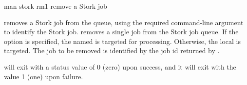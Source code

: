 \begin{ManPage}{}{man-stork-rm}{1}
{remove a Stork job}

\Synopsis {}
\ToolArgsBase

\Storkname
{}


\Description 

 removes a Stork job from the queue,
using the required command-line argument to identify the Stork job.
 removes a single job from the Stork job queue.  
If the  option is specified, the named  is targeted
for processing.  Otherwise, the local  is targeted.
The job to be removed is identified by the job id returned by  .

\begin{Options}
	\ToolArgsBaseDesc
	\StorknameDesc
\end{Options}

\ExitStatus

 will exit with a status value of 0 (zero) upon success,
and it will exit with the value 1 (one) upon failure.

\end{ManPage}
